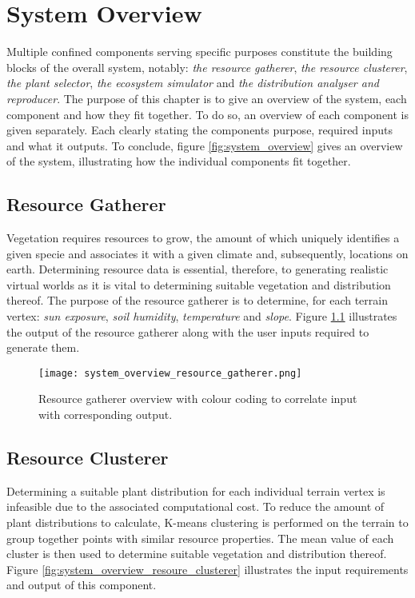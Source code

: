 \chapter{System Overview}

Multiple confined components serving specific purposes constitute the building blocks of the overall system, notably: \textit{the resource gatherer}, \textit{the resource clusterer}, \textit{the plant selector}, \textit{the ecosystem simulator} and \textit{the distribution analyser and reproducer}. The purpose of this chapter is to give an overview of the system, each component and how they fit together. To do so, an overview of each component is given separately. Each clearly stating the components purpose, required inputs and what it outputs. To conclude, figure \ref{fig:system_overview} gives an overview of the system, illustrating how the individual components fit together. \\

\section{Resource Gatherer}

Vegetation requires resources to grow, the amount of which uniquely identifies a given specie and associates it with a given climate and, subsequently, locations on earth. Determining resource data is essential, therefore, to generating realistic virtual worlds as it is vital to determining suitable vegetation and distribution thereof. The purpose of the resource gatherer is to determine, for each terrain vertex: \textit{sun exposure}, \textit{soil humidity}, \textit{temperature} and \textit{slope}. Figure \ref{fig:system_overview_resource_gatherer} illustrates the output of the resource gatherer along with the user inputs required to generate them.

\begin{figure}
\center
	\texttt{[image: system\_overview\_resource\_gatherer.png]}
	\caption{ Resource gatherer overview with colour coding to correlate input with corresponding output.}	
	\label{fig:system_overview_resource_gatherer}
\end{figure}

\section{Resource Clusterer}

Determining a suitable plant distribution for each individual terrain vertex is infeasible due to the associated computational cost. To reduce the amount of plant distributions to calculate, K-means clustering is performed on the terrain to group together points with similar resource properties. The mean value of each cluster is then used to determine suitable vegetation and distribution thereof. Figure \ref{fig:system_overview_resoure_clusterer} illustrates the input requirements and output of this component.

